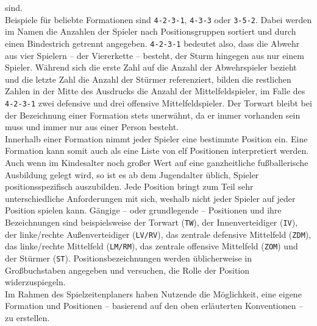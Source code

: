 sind. \\ 
Beispiele für beliebte Formationen sind \texttt{4-2-3-1}, \texttt{4-3-3} oder 
\texttt{3-5-2}. Dabei werden im Namen die Anzahlen der Spieler nach Positionsgruppen 
sortiert und durch einen Bindestrich getrennt angegeben. \texttt{4-2-3-1} bedeutet 
also, dass die Abwehr aus vier Spielern -- der Viererkette -- besteht, der Sturm 
hingegen aus nur einem Spieler. Während sich die erste Zahl auf die Anzahl der 
Abwehrspieler bezieht und die letzte Zahl die Anzahl der Stürmer referenziert, bilden 
die restlichen Zahlen in der Mitte des Ausdrucks die Anzahl der Mittelfeldspieler, im 
Falle des \texttt{4-2-3-1} zwei defensive und drei offensive Mittelfeldspieler. Der 
Torwart bleibt bei der Bezeichnung einer Formation stets unerwähnt, da er immer 
vorhanden sein muss und immer nur aus einer Person besteht. \\ 
Innerhalb einer Formation nimmt jeder Spieler eine bestimmte Position ein. Eine 
Formation kann somit auch als eine Liste von elf Positionen interpretiert werden. 
Auch wenn im Kindesalter noch großer Wert auf eine ganzheitliche fußballerische 
Ausbildung gelegt wird, so ist es ab dem Jugendalter üblich, Spieler 
positionsspezifisch auszubilden. Jede Position bringt zum Teil sehr unterschiedliche 
Anforderungen mit sich, weshalb nicht jeder Spieler auf jeder Position spielen kann. 
Gängige -- oder grundlegende -- Positionen und ihre Bezeichnungen sind beispielsweise 
der Torwart (\texttt{TW}), der Innenverteidiger (\texttt{IV}), der linke/rechte 
Außenverteidiger (\texttt{LV/RV}), das zentrale defensive Mittelfeld (\texttt{ZDM}), 
das linke/rechte Mittelfeld (\texttt{LM/RM}), das zentrale offensive Mittelfeld 
(\texttt{ZOM}) und der Stürmer (\texttt{ST}). Positionsbezeichnungen werden 
üblicherweise in Großbuchstaben angegeben und versuchen, die Rolle der Position 
widerzuspiegeln. \\ 
Im Rahmen des Spielzeitenplaners haben Nutzende die Möglichkeit, eine eigene Formation 
und Positionen -- basierend auf den oben erläuterten Konventionen -- zu erstellen. 

